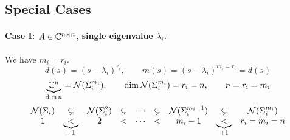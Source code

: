 \subsection{Special Cases}\label{ss:jordan-special}

\paragraph{Case I: $A\in\mathbb{C}^{n\times n}$, single eigenvalue $\lambda_i$.}
We have $m_i=r_i$.
\[
d(s)=(s-\lambda_i)^{r_i},\qquad m(s)=(s-\lambda_i)^{m_i=r_i}=d(s)
\]
\[
\underbrace{\mathbb{C}^n}_{\dim n}=\mathcal{N}(\Sigma_i^{m_i}),\qquad \dim\mathcal{N}(\Sigma_i^{m_i})=r_i=n,\qquad n=r_i=m_i
\]
\[
\begin{array}{ccccccccc}
\mathcal{N}(\Sigma_i) &\subsetneq& \mathcal{N}(\Sigma_i^2) &\subsetneq& \cdots &\subsetneq& \mathcal{N}(\Sigma_i^{m_i-1}) &\subsetneq& \mathcal{N}(\Sigma_i^{m_i})\\
1 &\underbrace{<}_{+1}& 2 &<& \cdots &<& m_i-1 &\underbrace{<}_{+1}& r_i=m_i=n
\end{array}
\]

